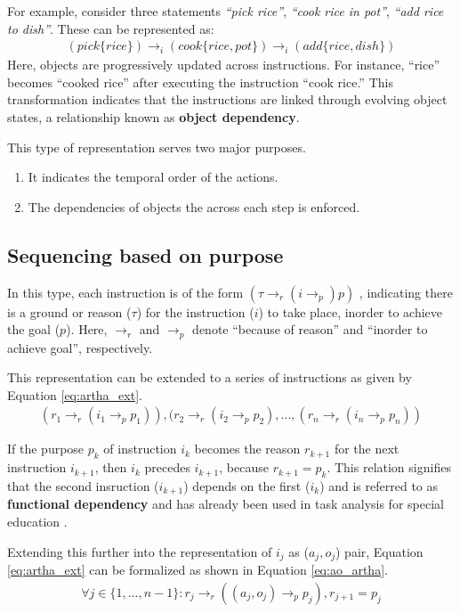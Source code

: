 \documentclass[a4paper,11pt]{lmcs}
\begin{document}
For example, consider three statements \textit{``pick rice''}, \textit{``cook rice in pot''}, \textit{``add rice to dish''}. These can be represented as:
\begin{eqnarray}
 (pick \{rice\}) \rightarrow_i (cook \{rice,
 pot\}) \rightarrow_i (add \{rice,dish\})
\end{eqnarray}
Here, objects are progressively updated across instructions. For instance, “rice” becomes “cooked rice” after executing the instruction “cook rice.” This transformation indicates that the instructions are linked through evolving object states, a relationship known as \textbf{object dependency}.

This type of representation serves two major purposes.

\begin{enumerate}
 \item It indicates the temporal order of the actions.
 \item The dependencies of objects the across each step is enforced.
\end{enumerate}
\subsection{Sequencing based on purpose}
\label{sec:artha}
In this type, each instruction is of the form $(\tau \rightarrow_r (i \rightarrow_p) p)$ \cite{llm_mira}, indicating there is a ground or reason ($\tau$) for the instruction ($i$) to take place, inorder to achieve the goal ($p$). Here, $\rightarrow_r$ and $\rightarrow_p$ denote ``because of reason'' and ``inorder to achieve  goal'', respectively.

This representation can be extended to a series of instructions as given by Equation \ref{eq:artha_ext}.
\begin{eqnarray}
 \label{eq:artha_ext}
 (r_1 \rightarrow_r (i_1 \rightarrow_p p_1)), (r_2 \rightarrow_r (i_2 \rightarrow_p p_2), ..., (r_n \rightarrow_r (i_n \rightarrow_p p_n))
\end{eqnarray}

If the purpose $p_k$ of instruction $i_k$ becomes the reason $r_{k+1}$ for the next instruction $i_{k+1}$, then $i_k$ precedes $i_{k+1}$, because $r_{k+1} = p_k$. This relation signifies that the second insruction ($i_{k+1}$) depends on the first ($i_k$) and is referred to as \textbf{functional dependency} and has already been used in task analysis for special education \cite{ta}.

Extending this further into the representation  of $i_j$ as ($a_j,o_j$) pair, Equation \ref{eq:artha_ext} can be formalized as shown in Equation \ref{eq:ao_artha}.
\begin{eqnarray}
 \label{eq:ao_artha}
\forall j \in \{1,...,n-1\}: r_j \rightarrow_r ((a_j,o_j) \rightarrow_p p_j), r_{j+1} = p_j
\end{eqnarray}
\end{document}
